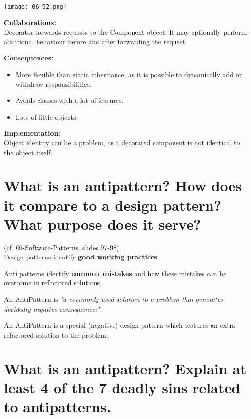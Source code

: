 \begin{center}
\texttt{[image: 06-92.png]}
\end{center}


\vspace{12pt}\textbf{Collaborations:}\\

Decorator forwards requests to the Component object. It may optionally perform additional behaviour before and after forwarding the request.




\vspace{12pt}\textbf{Consequences:}\\


\begin{itemize}
\item More flexible than static inheritance, as it is possible to dynamically add or withdraw responsibilities.
\item Avoids classes with a lot of features.
\item Lots of little objects.
\end{itemize}



\vspace{12pt}\textbf{Implementation:}\\

Object identity can be a problem, as a decorated component is not identical to the object itself.


\section{What is an antipattern? How does it compare to a design pattern? What purpose does it
serve?}

(cf. 06-Software-Patterns, slides 97-98)\\

Design patterns identify \textbf{good working practices}.

Anti patterns identify \textbf{common mistakes} and how these mistakes can be overcome in refactored solutions.

An AntiPattern is \textit{"a commonly used solution to a problem that generates decidedly negative consequences"}.

An AntiPattern is a special (negative) design pattern which features an extra refactored solution to the problem.


\section{What is an antipattern? Explain at least 4 of the 7 deadly sins related to antipatterns.}

